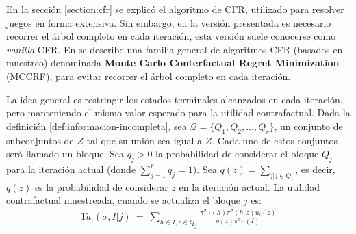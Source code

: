 En la sección \ref{section:cfr} se explicó el algoritmo de CFR, utilizado para resolver juegos en forma extensiva. Sin embargo, en la versión presentada es necesario recorrer el árbol completo en cada iteración, esta versión suele conocerse como \textit{vanilla} CFR. En \cite{bib:montecarlo-cfr} se describe una familia general de algoritmos CFR (basados en muestreo) denominada \textbf{Monte Carlo Conterfactual Regret Minimization} (MCCRF), para evitar recorrer el árbol completo en cada iteración.

La idea general es restringir los estados terminales alcanzados en cada iteración, pero manteniendo el mismo valor esperado para la utilidad contrafactual. Dada la definición \ref{def:informacion-incompleta}, sea $\mathcal{Q} = \{Q_1, Q_2, ..., Q_r\}$, un conjunto de subconjuntos de $Z$ tal que su unión sea igual a $Z$. Cada uno de estos conjuntos será llamado un bloque. Sea $q_j > 0$ la probabilidad de considerar el bloque $Q_j$ para la iteración actual (donde $\sum_{j = 1}^r {q_j} = 1$). 
Sea $q(z) = \sum_{j | j \in Q_i}$, es decir, $q(z)$ es la probabilidad de considerar $z$ en la iteración actual. La utilidad contrafactual muestreada, cuando se actualiza el bloque $j$ es:
\begin{alignat}{1}
\tilde{u}_i(\sigma, I | j)\ =\ \sum_{h \in I, z \in Q_j} \frac{\pi^{\sigma_{-i}}(h) \pi^{\sigma}(h, z) u_i(z)}{q(z) \pi^{\sigma_{-i}}(I)}
\end{alignat}

